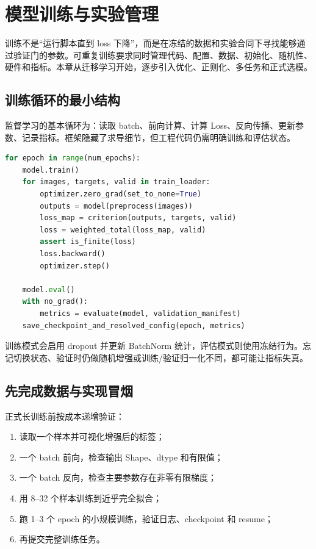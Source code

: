 \chapter{模型训练与实验管理}
\label{chap:edge-ai-model-training}

训练不是“运行脚本直到 loss 下降”，而是在冻结的数据和实验合同下寻找能够通过验证门的参数。可重复训练要求同时管理代码、配置、数据、初始化、随机性、硬件和指标。本章从迁移学习开始，逐步引入优化、正则化、多任务和正式选模。

\section{训练循环的最小结构}

监督学习的基本循环为：读取 batch、前向计算、计算 Loss、反向传播、更新参数、记录指标。框架隐藏了求导细节，但工程代码仍需明确训练和评估状态。

\begin{lstlisting}[language=Python,caption={框架无关的训练循环结构}]
for epoch in range(num_epochs):
    model.train()
    for images, targets, valid in train_loader:
        optimizer.zero_grad(set_to_none=True)
        outputs = model(preprocess(images))
        loss_map = criterion(outputs, targets, valid)
        loss = weighted_total(loss_map, valid)
        assert is_finite(loss)
        loss.backward()
        optimizer.step()

    model.eval()
    with no_grad():
        metrics = evaluate(model, validation_manifest)
    save_checkpoint_and_resolved_config(epoch, metrics)
\end{lstlisting}

训练模式会启用 dropout 并更新 BatchNorm 统计，评估模式则使用冻结行为。忘记切换状态、验证时仍做随机增强或训练/验证归一化不同，都可能让指标失真。

\section{先完成数据与实现冒烟}

正式长训练前按成本递增验证：

\begin{enumerate}
  \item 读取一个样本并可视化增强后的标签；
  \item 一个 batch 前向，检查输出 Shape、dtype 和有限值；
  \item 一个 batch 反向，检查主要参数存在非零有限梯度；
  \item 用 8--32 个样本训练到近乎完全拟合；
  \item 跑 1--3 个 epoch 的小规模训练，验证日志、checkpoint 和 resume；
  \item 再提交完整训练任务。
\end{enumerate}

